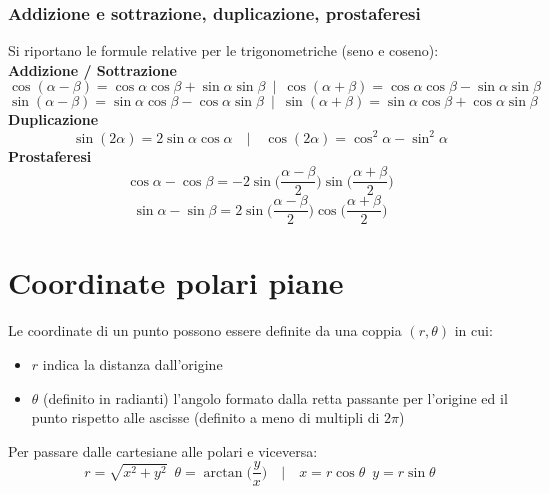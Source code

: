 \documentclass[10pt, oneside]{book}
\theoremstyle{plain}
\begin{document}
\subsubsection{Addizione e sottrazione, duplicazione, prostaferesi}
Si riportano le formule relative per le trigonometriche (seno e coseno):
\textbf{Addizione / Sottrazione}
\[\cos(\alpha - \beta) = \cos \alpha \cos \beta + \sin \alpha \sin \beta \enspace | \enspace \cos(\alpha + \beta) = \cos \alpha \cos \beta - \sin \alpha \sin \beta\]
\[\sin(\alpha - \beta) = \sin \alpha \cos \beta - \cos \alpha \sin \beta \enspace | \enspace \sin(\alpha + \beta) = \sin \alpha \cos \beta + \cos \alpha \sin \beta\]
\textbf{Duplicazione}
\[\sin (2\alpha) = 2 \sin \alpha \cos \alpha \quad \bigg| \quad \cos (2\alpha) = \cos^2\alpha - \sin^2 \alpha\]
\textbf{Prostaferesi}
\[\cos \alpha - \cos \beta = -2 \sin \big(\frac{\alpha - \beta}{2}\big)\sin\big(\frac{\alpha + \beta}{2}\big)\]
\[\sin \alpha - \sin \beta = 2 \sin \big(\frac{\alpha - \beta}{2}\big)\cos\big(\frac{\alpha + \beta}{2}\big)\]

\section{Coordinate polari piane}
Le coordinate di un punto possono essere definite da una coppia $(r, \theta)$ in cui:
\begin{itemize}
    \item $r$ indica la distanza dall'origine
    \item $\theta$ (definito in radianti) l'angolo formato dalla retta passante per l'origine ed il punto rispetto alle ascisse (definito a meno di multipli di $2\pi$)
\end{itemize}
Per passare dalle cartesiane alle polari e viceversa:
\[r = \sqrt{x^2 + y^2} \enspace \theta = \arctan\bigg( \frac{y}{x} \bigg) \quad \bigg| \quad x = r \cos \theta \enspace y = r \sin \theta\]
\end{document}
